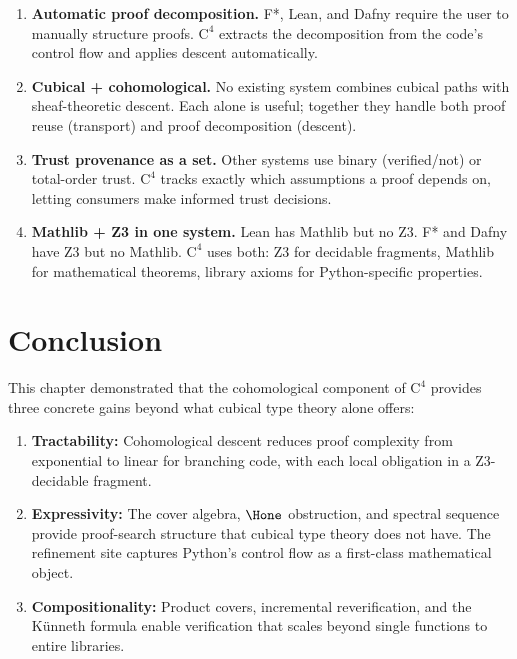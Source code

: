 \begin{enumerate}
\item \textbf{Automatic proof decomposition.}
  F*, Lean, and Dafny require the user to manually structure
  proofs.  $\mathrm{C}^4$ extracts the decomposition from the
  code's control flow and applies descent automatically.

\item \textbf{Cubical + cohomological.}
  No existing system combines cubical paths with sheaf-theoretic
  descent.  Each alone is useful; together they handle both
  proof reuse (transport) and proof decomposition (descent).

\item \textbf{Trust provenance as a set.}
  Other systems use binary (verified/not) or total-order trust.
  $\mathrm{C}^4$ tracks exactly which assumptions a proof depends
  on, letting consumers make informed trust decisions.

\item \textbf{Mathlib + Z3 in one system.}
  Lean has Mathlib but no Z3.  F* and Dafny have Z3 but no
  Mathlib.  $\mathrm{C}^4$ uses both: Z3 for decidable fragments,
  Mathlib for mathematical theorems, library axioms for
  Python-specific properties.
\end{enumerate}


\section{Conclusion}
\label{sec:compiler-conclusion}

This chapter demonstrated that the cohomological component of
$\mathrm{C}^4$ provides three concrete gains beyond what cubical
type theory alone offers:

\begin{enumerate}
\item \textbf{Tractability:} Cohomological descent reduces
  proof complexity from exponential to linear for branching code,
  with each local obligation in a Z3-decidable fragment.

\item \textbf{Expressivity:} The cover algebra, $\Hone$ obstruction,
  and spectral sequence provide proof-search structure that cubical
  type theory does not have.  The refinement site captures Python's
  control flow as a first-class mathematical object.

\item \textbf{Compositionality:} Product covers, incremental
  reverification, and the K\"unneth formula enable verification
  that scales beyond single functions to entire libraries.
\end{enumerate}

